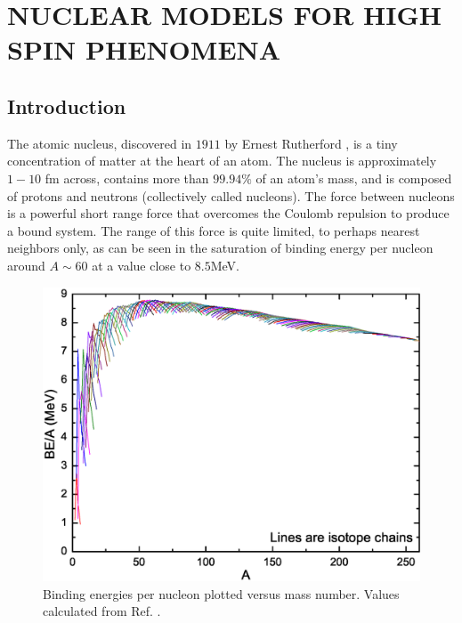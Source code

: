 %
%

\chapter{NUCLEAR MODELS FOR HIGH SPIN PHENOMENA}
\label{chp:models}

\section{Introduction}
\label{sec:models-into}
The atomic nucleus, discovered in $1911$ by Ernest Rutherford \cite{rutherfordNuclearModel}, is a tiny concentration of matter at the heart of an atom. The nucleus is approximately $1-10$ fm across, contains more than $99.94\%$ of an atom's mass, and is composed of protons and neutrons (collectively called nucleons). The force between nucleons is a powerful short range force that overcomes the Coulomb repulsion to produce a bound system. The range of this force is quite limited, to perhaps nearest neighbors only, as can be seen in the saturation of binding energy per nucleon around $A\sim60$ at a value close to $8.5$MeV.

\begin{figure}[h!]
\centerline{\includegraphics[width=\textwidth]{./img/c2/binding_plot.eps}}
	\caption{Binding energies per nucleon plotted versus mass number. Values calculated from Ref. \cite{AME20031,AME20032}.\label{fig:chp2-binding}}
\end{figure}

